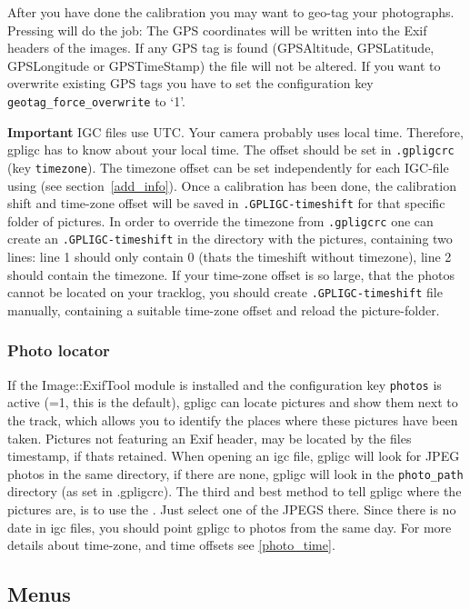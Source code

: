 After you have done the calibration you may want to geo-tag your photographs. Pressing  will do the job: The GPS coordinates will be written into the Exif headers of the images.
If any GPS tag is found (GPSAltitude, GPSLatitude, GPSLongitude or GPSTimeStamp) the file will not be altered.
If you want to overwrite existing GPS tags you have to set the configuration key \texttt{geotag\_force\_overwrite} to `1'.


\textbf{Important}  IGC files use UTC. Your camera probably uses local time. Therefore, gpligc has to know about your local time. The offset should be set in \texttt{.gpligcrc} (key \texttt{timezone}). The timezone offset can be set independently for each IGC-file using  (see section~\ref{add_info}).
Once a calibration has been done, the calibration shift and time-zone offset will be saved in \texttt{.GPLIGC-timeshift} for that specific folder of pictures. In order to override the timezone from \texttt{.gpligcrc} one can create an \texttt{.GPLIGC-timeshift} in the directory with the pictures, containing two lines: line 1 should only contain 0 (thats the timeshift without timezone), line 2 should contain the timezone.
If your time-zone offset is so large, that the photos cannot be located on your tracklog, you should create \texttt{.GPLIGC-timeshift} file manually, containing a suitable time-zone offset and reload the picture-folder.


\subsubsection{Photo locator}
If the Image::ExifTool module is installed and the configuration key \texttt{photos} is active (=1, this is the default),
gpligc can locate pictures and show them next to the track, which allows you to identify the places where these pictures have been taken. Pictures not featuring an Exif header, may be located by the files timestamp, if thats retained.
When opening an igc file, gpligc will look for JPEG photos in the same directory, if there are none, gpligc will look in the
\texttt{photo\_path} directory (as set in .gpligcrc). The third and best method to tell gpligc where the pictures are, is to use the
. Just select one of the JPEGS there.
Since there is no date in igc files, you should point gpligc to photos from the same day. For more details about time-zone, and time offsets see \ref{photo_time}.


\subsection{Menus}

